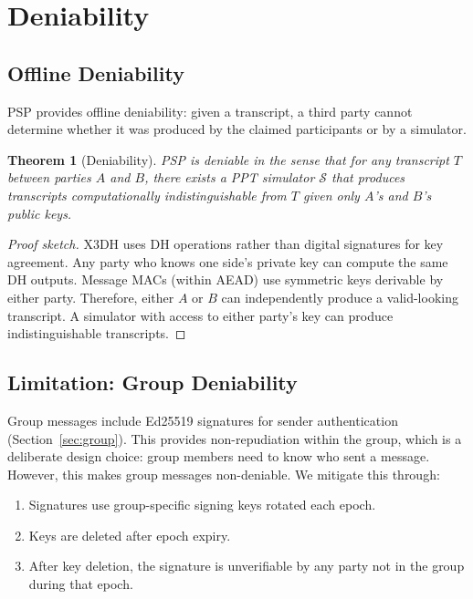 \documentclass[11pt,a4paper]{article}
\newtheorem{theorem}{Theorem}[section]
\begin{document}
\section{Deniability}
\label{sec:deniability}

\subsection{Offline Deniability}

PSP provides offline deniability: given a transcript, a third party cannot
determine whether it was produced by the claimed participants or by a
simulator.

\begin{theorem}[Deniability]
    PSP is deniable in the sense that for any transcript $T$ between
    parties $A$ and $B$, there exists a PPT simulator $\mathcal{S}$ that
    produces transcripts computationally indistinguishable from $T$ given
    only $A$'s and $B$'s public keys.
\end{theorem}

\begin{proof}[Proof sketch]
    X3DH uses DH operations rather than digital signatures for key
    agreement.  Any party who knows one side's private key can compute
    the same DH outputs.  Message MACs (within AEAD) use symmetric keys
    derivable by either party.  Therefore, either $A$ or $B$ can
    independently produce a valid-looking transcript.  A simulator with
    access to either party's key can produce indistinguishable transcripts.
\end{proof}

\subsection{Limitation: Group Deniability}

Group messages include Ed25519 signatures for sender authentication
(Section~\ref{sec:group}).  This provides non-repudiation within the group,
which is a deliberate design choice: group members need to know who sent a
message.  However, this makes group messages non-deniable.  We mitigate
this through:

\begin{enumerate}
    \item Signatures use group-specific signing keys rotated each epoch.
    \item Keys are deleted after epoch expiry.
    \item After key deletion, the signature is unverifiable by any party
    not in the group during that epoch.
\end{enumerate}
\end{document}
